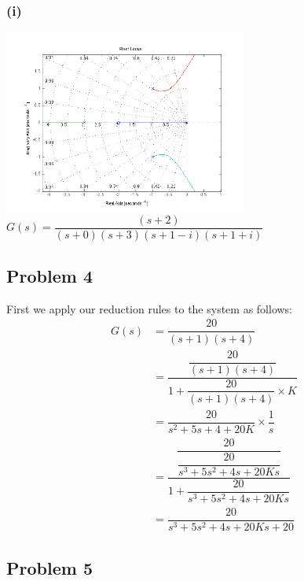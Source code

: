 \documentclass[letterpaper,10pt]{article}
\begin{document}
\subsubsection*{(i)}
\begin{center}
    \includegraphics[width=0.6\textwidth]{homework04-7-1-i.png} \\
   $G(s) = \dfrac{(s+2)}{(s+0)(s+3)(s+1-i)(s+1+i)}$
\end{center}

\subsection*{Problem 4}
First we apply our reduction rules to the system as follows:
\begin{align*}
	G(s) &= \dfrac{20}{(s+1)(s+4)} \\
	&= \dfrac{\dfrac{20}{(s+1)(s+4)}}{1+\dfrac{20}{(s+1)(s+4)}\times K} \\
	&= \dfrac{20}{s^{2}+5s+4+20K} \times \dfrac{1}{s} \\
	&= \dfrac{\dfrac{20}{\dfrac{20}{s^{3}+5s^{2}+4s+20Ks}}}{1+\dfrac{20}{s^{3}+5s^{2}+4s+20Ks}} \\
	&= \dfrac{20}{s^{3}+5s^{2}+4s+20Ks+20}
\end{align*}

\subsection*{Problem 5}
\end{document}
